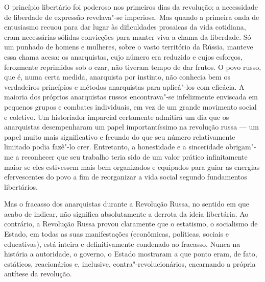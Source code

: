 O princípio libertário foi poderoso nos primeiros dias da revolução; a
necessidade de liberdade de expressão revelava"-se imperiosa. Mas
quando a primeira onda de entusiasmo recuou para dar lugar às
dificuldades prosaicas da vida cotidiana, eram necessárias sólidas
convicções para manter viva a chama da liberdade. Só um punhado de
homens e mulheres, sobre o vasto território da Rússia, manteve essa
chama acesa: os anarquistas, cujo número era reduzido e cujos esforços,
ferozmente reprimidos sob o czar, não tiveram tempo de dar frutos.
O povo russo, que é, numa certa medida, anarquista por instinto, não
conhecia bem os verdadeiros princípios e métodos anarquistas para
aplicá"-los com eficácia. A maioria dos próprios anarquistas russos
encontrava"-se infelizmente enviscada em pequenos grupos e combates
individuais, em vez de um grande movimento social e coletivo. Um
historiador imparcial certamente admitirá um dia que os anarquistas
desempenharam um papel importantíssimo na revolução russa --- um papel
muito mais significativo e fecundo do que seu número relativamente
limitado podia fazê"-lo crer. Entretanto, a honestidade e a
sinceridade obrigam"-me a reconhecer que seu trabalho teria sido de um
valor prático infinitamente maior se eles estivessem mais bem
organizados e equipados para guiar as energias efervescentes do povo a
fim de reorganizar a vida social segundo fundamentos libertários.

Mas o fracasso dos anarquistas durante a Revolução Russa, no sentido em
que acabo de indicar, não significa absolutamente a derrota da ideia
libertária. Ao contrário, a Revolução Russa provou claramente que o
estatismo, o socialismo de Estado, em todas as suas manifestações
(econômicas, políticas, sociais e educativas), está inteira e
definitivamente condenado ao fracasso. Nunca na história a autoridade, o
governo, o Estado mostraram a que ponto eram, de fato, estáticos,
reacionários e, inclusive, contra"-revolucionários, encarnando a
própria antítese da revolução.

